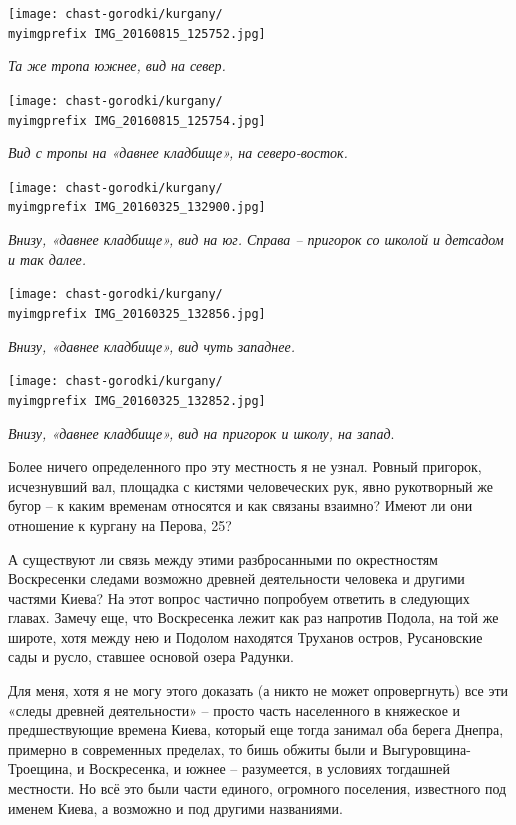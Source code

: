 \newpage

\begin{center}
\texttt{[image: chast-gorodki/kurgany/\\myimgprefix IMG\_20160815\_125752.jpg]}

\textit{Та же тропа южнее, вид на север.}
\end{center}


\begin{center}
\texttt{[image: chast-gorodki/kurgany/\\myimgprefix IMG\_20160815\_125754.jpg]}

\textit{Вид с тропы на «давнее кладбище», на северо-восток.}
\end{center}

\newpage


\begin{center}
\texttt{[image: chast-gorodki/kurgany/\\myimgprefix IMG\_20160325\_132900.jpg]}

\textit{Внизу, «давнее кладбище», вид на юг. Справа – пригорок со школой и детсадом и так далее.}
\end{center}

\begin{center}
\texttt{[image: chast-gorodki/kurgany/\\myimgprefix IMG\_20160325\_132856.jpg]}

\textit{Внизу, «давнее кладбище», вид чуть западнее.}
\end{center}

\newpage

\begin{center}
\texttt{[image: chast-gorodki/kurgany/\\myimgprefix IMG\_20160325\_132852.jpg]}

\textit{Внизу, «давнее кладбище», вид на пригорок и школу, на запад}.
\end{center}

Более ничего определенного про эту местность я не узнал. Ровный пригорок, исчезнувший вал, площадка с кистями человеческих рук, явно рукотворный же бугор – к каким временам относятся и как связаны взаимно? Имеют ли они отношение к кургану на Перова, 25?

А существуют ли связь между этими разбросанными по окрестностям Воскресенки следами возможно древней деятельности человека и другими частями Киева? На этот вопрос частично попробуем ответить в следующих главах. Замечу еще, что Воскресенка лежит как раз напротив Подола, на той же широте, хотя между нею и Подолом находятся Труханов остров, Русановские сады и русло, ставшее основой озера Радунки.

Для меня, хотя я не могу этого доказать (а никто не может опровергнуть) все эти «следы древней деятельности» – просто часть населенного в княжеское и предшествующие времена Киева, который еще тогда занимал оба берега Днепра, примерно в современных пределах, то бишь обжиты были и Выгуровщина-Троещина, и Воскресенка, и южнее – разумеется, в условиях тогдашней местности. Но всё это были части единого, огромного поселения, известного под именем Киева, а возможно и под другими названиями. 
